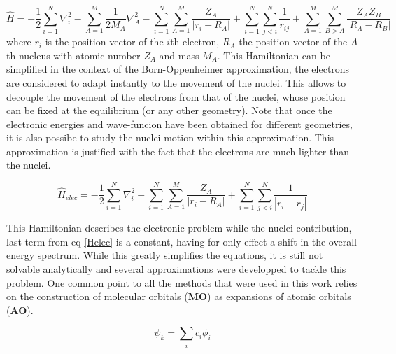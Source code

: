 \documentclass[12pt]{report}
\numberwithin{equation}{section}
\begin{document}
\begin{equation}\label{Helec}
    \hat{H}=-\frac{1}{2}\sum_{i=1}^{N}\nabla_i^2-\sum_{A=1}^{M}\frac{1}{2M_A}\nabla_A^2%
    -\sum_{i=1}^{N}\sum_{A=1}^{M}\frac{Z_A}{|r_i-R_A|}+\sum_{i=1}^{N}\sum_{j<i}^{N}\frac{1}{r_{ij}}%
    +\sum_{A=1}^{M}\sum_{B>A}^{M}\frac{Z_A Z_B}{|R_A-R_B|}
\end{equation}
where $r_i$ is the position vector of the $i$th electron, $R_A$ the position vector of the $A$th nucleus with atomic number $Z_A$ and mass $M_A$.
This Hamiltonian can be simplified in the context of the Born-Oppenheimer approximation, the electrons are considered to adapt instantly to the movement of the nuclei.
This allows to decouple the movement of the electrons from that of the nuclei, whose position can be fixed at the equilibrium (or any other geometry).
Note that once the electronic energies and wave-funcion have been obtained for different geometries, it is also possibe to study the nuclei motion within this approximation.
This approximation is justified with the fact that the electrons are much lighter than the nuclei. 

\begin{equation}\label{HBO}
    \hat{H}_{elec}=-\frac{1}{2}\sum_{i=1}^{N}\nabla_i^2%
    -\sum_{i=1}^{N}\sum_{A=1}^{M}\frac{Z_A}{|r_i-R_A|}+\sum_{i=1}^{N}\sum_{j<i}^{N}\frac{1}{|r_i-r_j|}%
\end{equation}

This Hamiltonian describes the electronic problem while the nuclei contribution, last term from eq \ref{Helec} is a constant, having for only effect a shift in the overall energy spectrum. 
While this greatly simplifies the equations, it is still not solvable analytically and several approximations were developped to tackle this problem. %
One common point to all the methods that were used in this work relies on the construction of molecular orbitals (\textbf{MO}) as expansions of atomic orbitals (\textbf{AO}).

\begin{equation}
    \psi_k=\sum_{i}c_i \phi_i
\end{equation}
\end{document}
